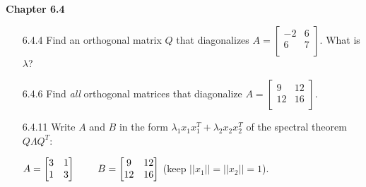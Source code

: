 \documentclass[10pt,twoside,reqno]{article}
\begin{document}
\vspace{5mm}
\textbf{Chapter 6.4}
\begin{enumerate}
\item[6.4.4] Find an orthogonal matrix $Q$ that diagonalizes $A=
\begin{bmatrix}
-2&6\\
6&7\\
\end{bmatrix}$. What is $\lambda$?
\\ \vspace{2mm}


\vspace{3mm}
\item[6.4.6] Find \textit{all} orthogonal matrices that diagonalize $A = 
\begin{bmatrix}
9&12\\
12&16\\
\end{bmatrix}$. \\ \vspace{2mm}


\vspace{3mm}
\item[6.4.11] Write $A$ and $B$ in the form $\lambda_1x_1x_1^T+\lambda_2x_2x_2^T$ of the spectral theorem $Q \Lambda Q^T$: \\
\begin{center}
$
A=
\begin{bmatrix}
3&1\\
1&3\\
\end{bmatrix}
\hspace{8mm}
B=
\begin{bmatrix}
9&12\\
12&16\\
\end{bmatrix}
$
\hspace{6mm} (keep $||x_1||=||x_2||=1$). \\
\end{center}
\vspace{2mm}



\end{enumerate}
\end{document}
